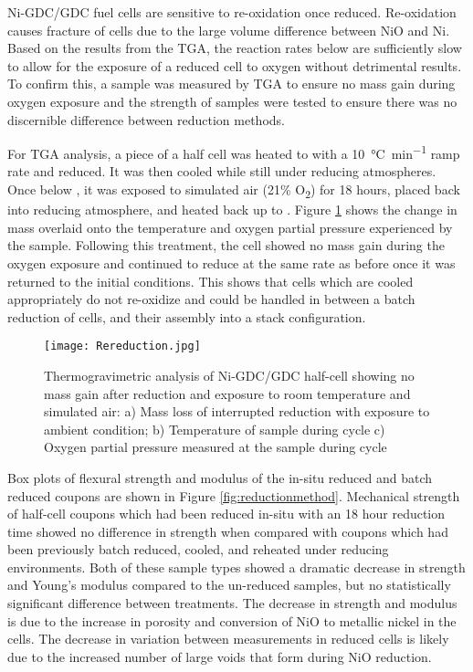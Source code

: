 Ni-GDC/GDC fuel cells are sensitive to re-oxidation once reduced.
Re-oxidation causes fracture of cells due to the large volume difference between NiO and Ni.\cite{Nakajo2012}
Based on the results from the TGA, the reaction rates below  are sufficiently slow to allow for the exposure of a reduced cell to oxygen without detrimental results.\cite{Richardson2003}
To confirm this, a sample was measured by TGA to ensure no mass gain during oxygen exposure and the strength of samples were tested to ensure there was no discernible difference between reduction methods.

For TGA analysis, a piece of a half cell was heated to  with a \SI{10}{\celsius\per\minute} ramp rate and reduced.
It was then cooled while still under reducing atmospheres.
Once below , it was exposed to simulated air
(21\% O\textsubscript{2}) for 18 hours, placed back into reducing atmosphere, and heated back up to .
Figure \ref{fig:rereduction} shows the change in mass overlaid onto the temperature and oxygen partial pressure experienced by the sample.
Following this treatment, the cell showed no mass gain during the oxygen exposure and continued to reduce at the same rate as before once it was returned to the initial conditions.
This shows that cells which are cooled appropriately do not re-oxidize and could be handled in between a batch reduction of cells, and their assembly into a stack configuration.

\begin{figure}
    \texttt{[image: Rereduction.jpg]}
    \caption{Thermogravimetric analysis of Ni-GDC/GDC half-cell showing no mass gain after reduction and exposure to room temperature and simulated air: a) Mass loss of interrupted reduction with exposure to ambient condition; b) Temperature of sample during cycle c) Oxygen partial pressure measured at the sample during cycle}
    \label{fig:rereduction}
\end{figure}

Box plots of flexural strength and modulus of the in-situ reduced and batch reduced coupons are shown in Figure \ref{fig:reductionmethod}.
Mechanical strength of half-cell coupons which had been reduced in-situ with an 18 hour reduction time showed no difference in strength when compared with coupons which had been previously batch reduced, cooled, and reheated under reducing environments.
Both of these sample types showed a dramatic decrease in strength and Young's modulus compared to the un-reduced samples, but no statistically significant difference between treatments.
The decrease in strength and modulus is due to the increase in porosity and conversion of NiO to metallic nickel in the cells.
The decrease in variation between measurements in reduced cells is likely due to the increased number of large voids that form during NiO reduction.


